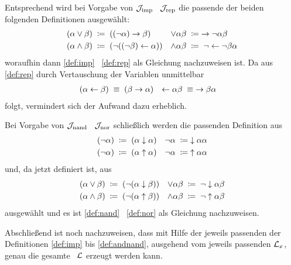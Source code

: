 Entsprechend wird bei Vorgabe von $\mathcal{J}_{\mathrm{imp}}$ \textbzgl\ $\mathcal{J}_{\mathrm{rep}}$ die passende der beiden folgenden Definitionen ausgewählt:
\begin{align}
	(\alpha \lor  \beta) & \;\coloneqq\; ((\lnot \alpha) \rightarrow \beta)         &
	\lor \alpha   \beta  & \;\coloneqq\;   \rightarrow \lnot \alpha \beta
	\label{def:orrep}
	\\
	(\alpha \land \beta) & \;\coloneqq\; (\lnot ((\lnot \beta) \leftarrow \alpha)) &
	\land \alpha  \beta  & \;\coloneqq\;  \lnot \leftarrow \lnot \beta \alpha
	\label{def:andrep}
\end{align}
woraufhin dann \eqref{def:imp} \textbzgl\ \eqref{def:rep} als Gleichung nachzuweisen ist.
Da aus \eqref{def:rep} durch Vertauschung der Variablen unmittelbar
\begin{align}
	(\alpha \leftarrow \beta) & \;\equiv\; (\beta \rightarrow \alpha) &
	\leftarrow \alpha  \beta  & \;\equiv\;  \rightarrow \beta \alpha  \label{eq:repimp}
\end{align}
folgt, vermindert sich der Aufwand dazu erheblich.

Bei Vorgabe von $\mathcal{J}_{\mathrm{nand}}$ \textbzgl\ $\mathcal{J}_{\mathrm{nor}}$ schließlich werden die passenden Definition aus
\begin{align}
	(\lnot \alpha) & \;\coloneqq\; (\alpha \downarrow \alpha)  &
	\lnot  \alpha  & \;\coloneqq\;  \downarrow \alpha \alpha   \label{def:notnor} \\
	(\lnot \alpha) & \;\coloneqq\; (\alpha \uparrow \alpha) &
	\lnot  \alpha  & \;\coloneqq\;  \uparrow \alpha \alpha  \label{def:notnand}
\end{align}
und, da \chrqt{$\lnot$} jetzt definiert ist, aus
\begin{align}
	(\alpha \lor \beta)  & \;\coloneqq\; (\lnot(\alpha \downarrow \beta))  &
	\lor \alpha  \beta   & \;\coloneqq\;  \lnot \downarrow \alpha \beta
	\label{def:ornor} \\
	(\alpha \land \beta) & \;\coloneqq\; (\lnot(\alpha \uparrow \beta)) &
	\land \alpha  \beta  & \;\coloneqq\;  \lnot \uparrow \alpha \beta
	\label{def:andnand}
\end{align}
ausgewählt und es ist \eqref{def:nand} \textbzgl\ \eqref{def:nor} als Gleichung nachzuweisen.

Abschließend ist noch nachzuweisen, dass mit Hilfe der jeweils passenden der Definitionen \eqref{def:imp} bis \eqref{def:andnand}, ausgehend vom jeweils passenden $\mathcal{L}_x$, genau die gesamte \Formelmenge\ $\mathcal{L}$ erzeugt werden kann.

